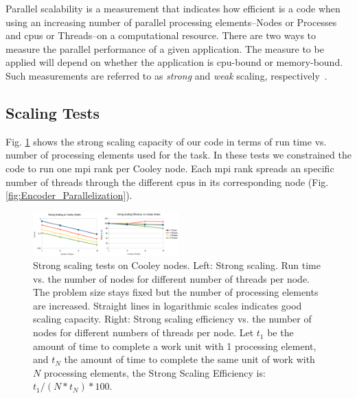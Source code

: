 \documentclass[10pt,journal,compsoc]{IEEEtran}
\begin{document}
Parallel scalability is a measurement that indicates how efficient is a code when using an increasing number of parallel processing elements--Nodes or Processes and \glspl{cpu} or Threads--on a computational resource. There are two ways to measure the parallel performance of a given application. The measure to be applied will depend on whether the application is \gls{cpu}-bound or memory-bound. Such measurements are referred to as \emph{strong} and \emph{weak} scaling, respectively~\cite{noauthor_measuring_nodate}.

















\subsection{ Scaling Tests}

Fig. \ref{fig:Strong_Scaling} shows the strong scaling capacity of our code in terms of run time vs. number of processing elements used for the task. In these tests we constrained the code to run one \gls{mpi} rank per Cooley node. Each \gls{mpi} rank spreads an specific number of threads through the different \glspl{cpu} in its corresponding node (Fig. \ref{fig:Encoder_Parallelization}).

\begin{figure}[h!]
    \centering
    \includegraphics[width=0.5\textwidth]{Strong_Scaling.png}
    \caption{Strong scaling tests on Cooley nodes. Left: Strong scaling. Run time vs. the number of nodes for different number of threads per node. The problem size stays fixed but the number of processing elements are increased. Straight lines in logarithmic scales indicates good scaling capacity. Right: Strong scaling efficiency vs. the number of nodes for different numbers of threads per node. Let $t_1$ be the amount of time to complete a work unit with 1 processing element, and $t_N$ the amount of time to complete the same unit of work with $N$ processing elements, the Strong Scaling Efficiency is: $t_1 / (N * t_N) * 100$.}
    \label{fig:Strong_Scaling}
\end{figure}
\end{document}
